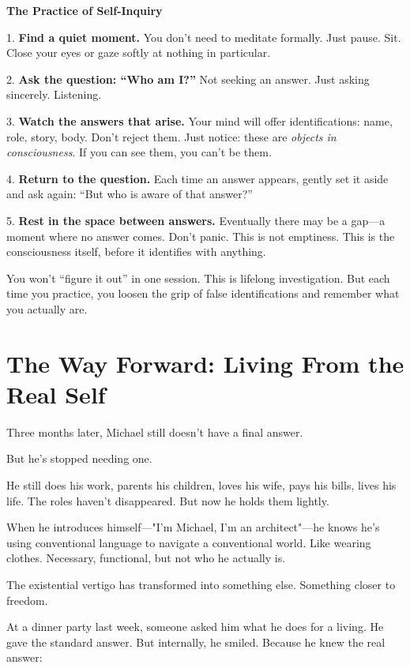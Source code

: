 \documentclass[11pt,twoside]{book}
\begin{document}
\begin{practicebox}
\textbf{The Practice of Self-Inquiry}

1. \textbf{Find a quiet moment.} You don't need to meditate formally. Just pause. Sit. Close your eyes or gaze softly at nothing in particular.

2. \textbf{Ask the question: ``Who am I?''} Not seeking an answer. Just asking sincerely. Listening.

3. \textbf{Watch the answers that arise.} Your mind will offer identifications: name, role, story, body. Don't reject them. Just notice: these are \textit{objects in consciousness}. If you can see them, you can't be them.

4. \textbf{Return to the question.} Each time an answer appears, gently set it aside and ask again: ``But who is aware of that answer?''

5. \textbf{Rest in the space between answers.} Eventually there may be a gap—a moment where no answer comes. Don't panic. This is not emptiness. This is the consciousness itself, before it identifies with anything.

You won't ``figure it out'' in one session. This is lifelong investigation. But each time you practice, you loosen the grip of false identifications and remember what you actually are.
\end{practicebox}

\section*{The Way Forward: Living From the Real Self}

Three months later, Michael still doesn't have a final answer.

But he's stopped needing one.

He still does his work, parents his children, loves his wife, pays his bills, lives his life. The roles haven't disappeared. But now he holds them lightly.

When he introduces himself—"I'm Michael, I'm an architect"—he knows he's using conventional language to navigate a conventional world. Like wearing clothes. Necessary, functional, but not who he actually is.

The existential vertigo has transformed into something else. Something closer to freedom.

At a dinner party last week, someone asked him what he does for a living. He gave the standard answer. But internally, he smiled. Because he knew the real answer:
\end{document}
